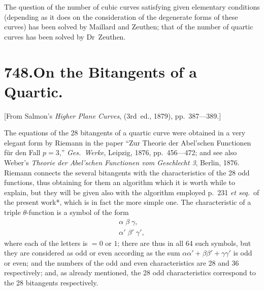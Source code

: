 \documentclass[11pt,a4paper]{book}
\begin{document}
The question of the number of cubic curves satisfying given elementary conditions (depending as it does on the consideration of the degenerate forms of these curves) has been solved by Maillard and Zeuthen; that of the number of quartic curves has been solved by Dr~Zeuthen.


\newpage
\section*{\textbf{748.}\quad On the Bitangents of a Quartic.}

[From Salmon's \textit{Higher Plane Curves}, (3rd~ed., 1879), pp.~387---389.]

\medskip

The equations of the 28 bitangents of a quartic curve were obtained in a very elegant form by Riemann in the paper ``Zur Theorie der Abel'schen Functionen f\"ur den Fall $p = 3$,'' \textit{Ges.\ Werke}, Leipzig, 1876, pp.~456---472; and see also Weber's \textit{Theorie der Abel'schen Functionen vom Geschlecht 3}, Berlin, 1876. Riemann connects the several bitangents with the characteristics of the 28 odd functions, thus obtaining for them an algorithm which it is worth while to explain, but they will be given also with the algorithm employed p.~231 \textit{et seq.}\ of the present work*, which is in fact the more simple one. The characteristic of a triple $\theta$-function is a symbol of the form
\[
\begin{array}{c}
\alpha\;\beta\;\gamma, \\[-4pt]
\alpha'\;\beta'\;\gamma',
\end{array}
\]
where each of the letters is $= 0$ or $1$; there are thus in all 64 such symbols, but they are considered as odd or even according as the sum $\alpha\alpha' + \beta\beta' + \gamma\gamma'$ is odd or even; and the numbers of the odd and even characteristics are 28 and 36 respectively; and, as already mentioned, the 28 odd characteristics correspond to the 28 bitangents respectively.

\end{document}
